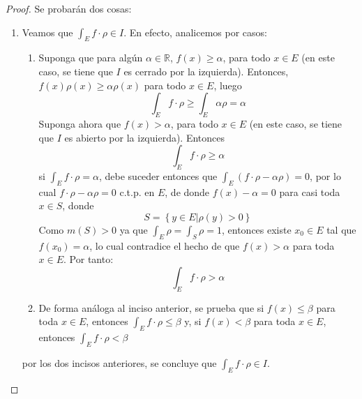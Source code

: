 \documentclass[12pt]{report}
\theoremstyle{largebreak}
\begin{document}
    \begin{proof}
        Se probarán dos cosas:
        \begin{enumerate}
            \item Veamos que $\int_{E}f\cdot\rho\in I$. En efecto, analicemos por casos:
            \begin{enumerate}
                \item Suponga que para algún $\alpha\in\mathbb{R}$, $f(x)\geq\alpha$, para todo $x\in E$ (en este caso, se tiene que $I$ es cerrado por la izquierda). Entonces, $f(x)\rho(x)\geq \alpha\rho(x)$ para todo $x\in E$, luego
                \begin{equation*}
                    \int_Ef\cdot\rho\geq\int_E\alpha\rho=\alpha
                \end{equation*}
                Suponga ahora que $f(x)>\alpha$, para todo $x\in E$ (en este caso, se tiene que $I$ es abierto por la izquierda). Entonces
                \begin{equation*}
                    \int_Ef\cdot\rho\geq\alpha
                \end{equation*}
                si $\int_Ef\cdot\rho=\alpha$, debe suceder entonces que $\int_E(f\cdot\rho-\alpha\rho)=0$, por lo cual $f\cdot\rho-\alpha\rho=0$ c.t.p. en $E$, de donde $f(x)-\alpha=0$ para casi toda $x\in S$, donde
                \begin{equation*}
                    S=\left\{y\in E\Big|\rho(y)>0 \right\}
                \end{equation*}
                Como $m(S)>0$ ya que $\int_E\rho=\int_S\rho=1$, entonces existe $x_0\in E$ tal que $f(x_0)=\alpha$, lo cual contradice el hecho de que $f(x)>\alpha$ para toda $x\in E$. Por tanto:
                \begin{equation*}
                    \int_Ef\cdot\rho>\alpha
                \end{equation*}
                \item De forma análoga al inciso anterior, se prueba que si $f(x)\leq \beta$ para toda $x\in E$, entonces $\int_Ef\cdot\rho\leq \beta$ y, si $f(x)< \beta$ para toda $x\in E$, entonces $\int_Ef\cdot\rho<\beta$
            \end{enumerate}
            por los dos incisos anteriores, se concluye que $\int_Ef\cdot\rho\in I$.


\end{enumerate}
\end{proof}
\end{document}
